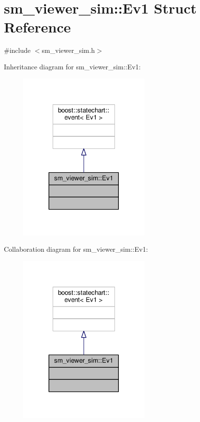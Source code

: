 \hypertarget{structsm__viewer__sim_1_1Ev1}{}\section{sm\+\_\+viewer\+\_\+sim\+:\+:Ev1 Struct Reference}
\label{structsm__viewer__sim_1_1Ev1}


{\ttfamily \#include $<$sm\+\_\+viewer\+\_\+sim.\+h$>$}



Inheritance diagram for sm\+\_\+viewer\+\_\+sim\+:\+:Ev1\+:\nopagebreak
\begin{figure}[H]
\begin{center}
\leavevmode
\includegraphics[width=188pt]{structsm__viewer__sim_1_1Ev1__inherit__graph}
\end{center}
\end{figure}


Collaboration diagram for sm\+\_\+viewer\+\_\+sim\+:\+:Ev1\+:\nopagebreak
\begin{figure}[H]
\begin{center}
\leavevmode
\includegraphics[width=188pt]{structsm__viewer__sim_1_1Ev1__coll__graph}
\end{center}
\end{figure}



